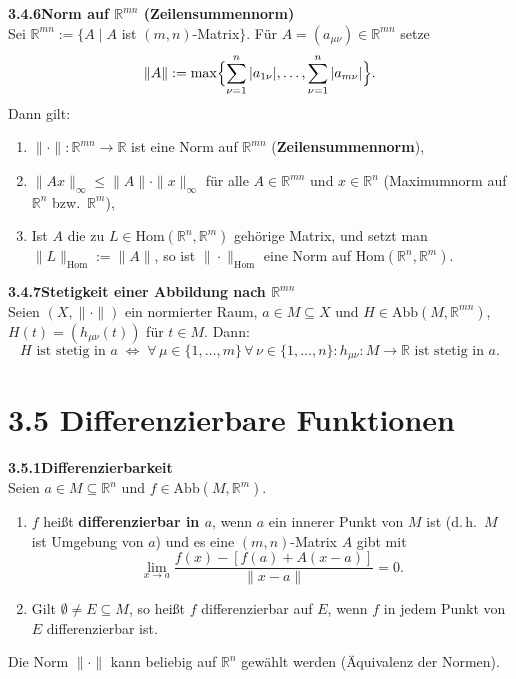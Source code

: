\documentclass[a4paper,12pt]{article}
\newcommand{\gentry}[3]{%
  \noindent\textbf{#1\quad #2}\nopagebreak\\[0.2em]
  #3\par\smallskip
}
\begin{document}
\gentry{3.4.6}{Norm auf $\mathbb{R}^{mn}$ (Zeilensummennorm)}{%
  Sei $\mathbb{R}^{mn} := \{A \mid A$ ist $(m, n)$-Matrix$\}$. F\"ur
  $A = (a_{\mu\nu}) \in \mathbb{R}^{mn}$ setze
  \[
    \|A\| := \max\Bigl\{\sum_{\nu=1}^n |a_{1\nu}|, \ldots, \sum_{\nu=1}^n |a_{m\nu}|\Bigr\}.
  \]
  Dann gilt:
  \begin{enumerate}[label=(\roman*),topsep=2pt,itemsep=1pt]
    \item $\|\cdot\| : \mathbb{R}^{mn} \to \mathbb{R}$ ist eine Norm auf $\mathbb{R}^{mn}$
          (\textbf{Zeilensummennorm}),
    \item $\|Ax\|_\infty \leq \|A\| \cdot \|x\|_\infty$ f\"ur alle $A \in \mathbb{R}^{mn}$
          und $x \in \mathbb{R}^n$ (Maximumnorm auf $\mathbb{R}^n$ bzw.\ $\mathbb{R}^m$),
    \item Ist $A$ die zu $L \in \mathrm{Hom}(\mathbb{R}^n, \mathbb{R}^m)$ geh\"orige Matrix,
          und setzt man $\|L\|_{\mathrm{Hom}} := \|A\|$, so ist $\|\cdot\|_{\mathrm{Hom}}$
          eine Norm auf $\mathrm{Hom}(\mathbb{R}^n, \mathbb{R}^m)$.
  \end{enumerate}
}

\gentry{3.4.7}{Stetigkeit einer Abbildung nach $\mathbb{R}^{mn}$}{%
  Seien $(X, \|\cdot\|)$ ein normierter Raum, $a \in M \subseteq X$ und
  $H \in \mathrm{Abb}(M, \mathbb{R}^{mn})$, $H(t) = (h_{\mu\nu}(t))$ f\"ur $t \in M$. Dann:
  \[
    H \text{ ist stetig in } a \;\Longleftrightarrow\;
    \forall\, \mu \in \{1,\ldots,m\}\, \forall\, \nu \in \{1,\ldots,n\}:
    h_{\mu\nu} : M \to \mathbb{R} \text{ ist stetig in } a.
  \]
}

\section*{3.5 \quad Differenzierbare Funktionen}

\gentry{3.5.1}{Differenzierbarkeit}{%
  Seien $a \in M \subseteq \mathbb{R}^n$ und $f \in \mathrm{Abb}(M, \mathbb{R}^m)$.
  \begin{enumerate}[label=(\roman*),topsep=2pt,itemsep=1pt]
    \item $f$ hei{\ss}t \textbf{differenzierbar in $a$}, wenn $a$ ein innerer Punkt von $M$
          ist (d.\,h.\ $M$ ist Umgebung von $a$) und es eine $(m, n)$-Matrix $A$ gibt mit
          \[
            \lim_{x \to a} \frac{f(x) - [f(a) + A(x - a)]}{\|x - a\|} = 0.
          \]
    \item Gilt $\emptyset \neq E \subseteq M$, so hei{\ss}t $f$ differenzierbar auf $E$,
          wenn $f$ in jedem Punkt von $E$ differenzierbar ist.
  \end{enumerate}
  Die Norm $\|\cdot\|$ kann beliebig auf $\mathbb{R}^n$ gew\"ahlt werden (\"Aquivalenz der Normen).
}
\end{document}

